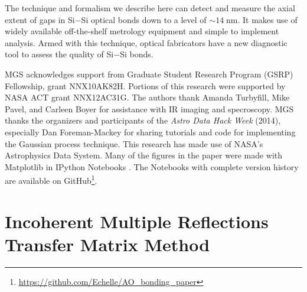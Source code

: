\documentclass[osajnl,preprint,showpacs,superscriptaddress,12pt]{revtex4-1} %
\begin{document}
The technique and formalism we describe here can detect and measure the axial extent of gaps in Si$-$Si optical bonds down to a level of $\sim14\;$nm.  It makes use of widely available off-the-shelf metrology equipment and simple to implement analysis.  Armed with this technique, optical fabricators have a new diagnostic tool to assess the quality of Si$-$Si bonds.

MGS acknowledges support from Graduate Student Research Program (GSRP) Fellowship, grant NNX10AK82H.  Portions of this research were supported by NASA ACT grant NNX12AC31G.  The authors thank Amanda Turbyfill, Mike Pavel, and Carleen Boyer for assistance with IR imaging and specroscopy.  MGS thanks the organizers and participants of the \emph{Astro Data Hack Week} (2014), especially Dan Foreman-Mackey for sharing tutorials and code for implementing the Gaussian process technique.  This research has made use of NASA's Astrophysics Data System.  Many of the figures in the paper were made with Matplotlib \citep{Hunter:2007} in IPython Notebooks \citep{PER-GRA:2007}.  The Notebooks with complete version history are available on GitHub\footnote{\url{https://github.com/Echelle/AO_bonding_paper}}.

\appendix

\section{Incoherent Multiple Reflections Transfer Matrix Method}
\label{sec:Append-IMRTMM}
\end{document}
